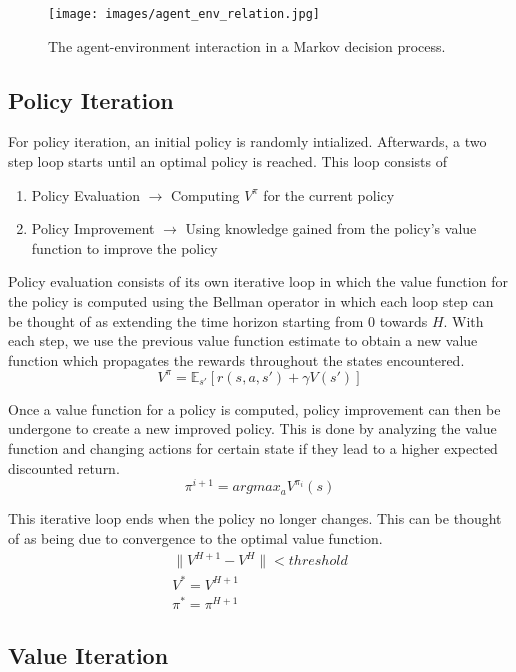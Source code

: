 \documentclass[fullpage]{article}
\begin{document}
\begin{figure}[H]
\centering
\texttt{[image: images/agent\_env\_relation.jpg]}
\caption{The agent-environment interaction in a Markov decision process.}
\label{fig:gridworld}
\end{figure}

\subsection{Policy Iteration}
For policy iteration, an initial policy is randomly intialized. Afterwards, a two step loop starts until an optimal policy is reached. This loop consists of

\begin{enumerate}
\item Policy Evaluation $\rightarrow$ Computing $V^\pi$ for the current policy
\item Policy Improvement $\rightarrow$ Using knowledge gained from the policy's value function to improve the policy
\end{enumerate}

Policy evaluation consists of its own iterative loop in which the value function for the policy is computed using the Bellman operator in which each loop step can be thought of as extending the time horizon starting from 0 towards $H$. With each step, we use the previous value function estimate to obtain a new value function which propagates the rewards throughout the states encountered.
\[
V^\pi = \mathbb{E}_{s'}[r(s, a, s') + \gamma V(s')]
\]

Once a value function for a policy is computed, policy improvement can then be undergone to create a new improved policy. This is done by analyzing the value function and changing actions for certain state if they lead to a higher expected discounted return.
\[
\pi^{i+1} = argmax_a V^{\pi_i}(s)
\]

This iterative loop ends when the policy no longer changes. This can be thought of as being due to convergence to the optimal value function.
\begin{gather}
\lVert V^{H+1} - V^H \lVert < threshold \\
V^* = V^{H+1} \\
\pi^* = \pi^{H+1}
\end{gather}

\subsection{Value Iteration}
\end{document}
